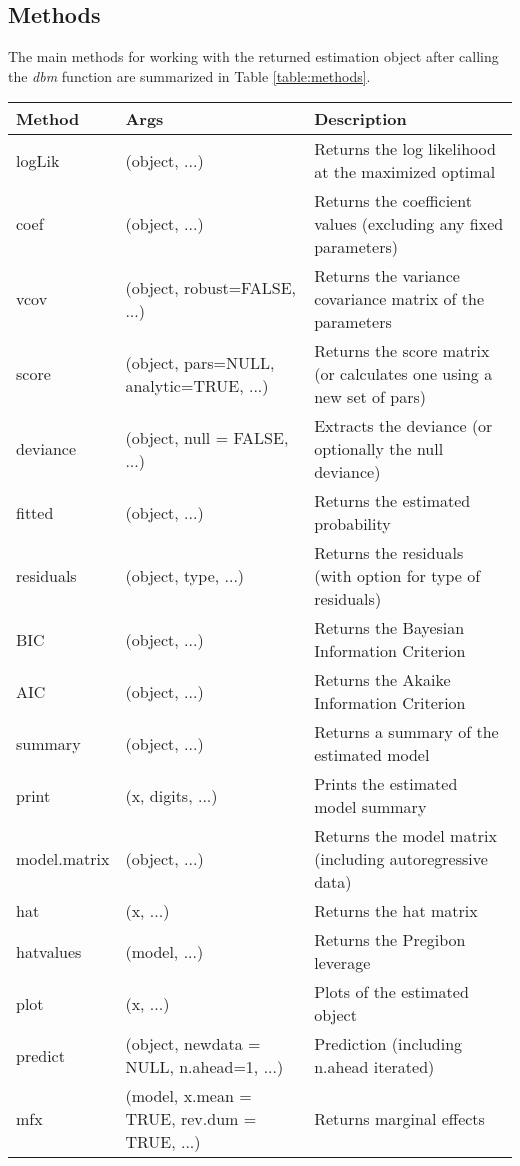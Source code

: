 \subsection{Methods}
The main methods for working with the returned estimation object after calling the \emph{dbm} function are summarized in Table \ref{table:methods}.
{\tiny
{}
{
}{
\FL
\begin{tabular*}{1\textwidth}{@{\extracolsep{\fill}}lll}
    \textbf{Method} & \textbf{Args} & \textbf{Description} \\
    \hline
    logLik & (object, ...) & Returns the log likelihood at the maximized optimal \\
    coef  & (object, ...) & Returns the coefficient values (excluding any fixed parameters) \\
    vcov  & (object, robust=FALSE, ...) & Returns the variance covariance matrix of the parameters \\
    score & (object, pars=NULL, analytic=TRUE, ...) & Returns the score matrix (or calculates one using a new set of pars) \\
    deviance & (object, null = FALSE, ...) & Extracts the deviance (or optionally the null deviance) \\
    fitted & (object, ...) & Returns the estimated probability \\
    residuals & (object, type, ...) & Returns the residuals (with option for type of residuals) \\
    BIC   & (object, ...) & Returns the Bayesian Information Criterion \\
    AIC   & (object, ...) & Returns the Akaike Information Criterion \\
    summary & (object, ...) & Returns a summary of the estimated model \\
    print & (x, digits, ...) & Prints the estimated model summary \\
    model.matrix & (object, ...) & Returns the model matrix (including autoregressive data) \\
    hat   & (x, ...) & Returns the hat matrix \\
    hatvalues & (model, ...) & Returns the Pregibon leverage \\
    plot  & (x, ...) & Plots of the estimated object \\
    predict & (object, newdata = NULL, n.ahead=1, ...) & Prediction (including n.ahead iterated) \\
    mfx   & (model, x.mean = TRUE, rev.dum = TRUE, ...) & Returns marginal effects \\
\end{tabular*}
\LL
}}


